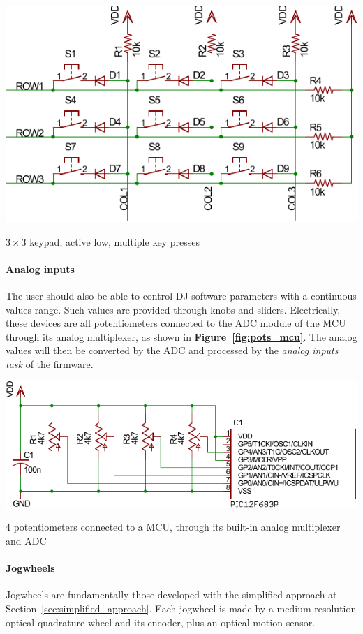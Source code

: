 \documentclass[a4paper,10pt]{article}
\makeatletter
\newenvironment{figurehere}{\def\@captype{figure}\vspace{2ex}}{\vspace{2ex}}
\newcommand{\citef}[1]{\textbf{Figure~\ref{#1}}}
\makeatother
\begin{document}
\begin{multicols}{2}
\begin{figurehere}
	\centering
	\includegraphics[keepaspectratio=true,width=0.8\columnwidth]{images/keypad.pdf}
	\caption{$ 3 \times 3 $ keypad, active low, multiple key presses}
	\label{fig:keypad}
\end{figurehere}


\paragraph{Analog inputs}
The user should also be able to control DJ software parameters with a 
continuous values range. Such values are provided through knobs and sliders.
Electrically, these devices are all potentiometers connected to the ADC module
of the MCU through its analog multiplexer, as shown in \citef{fig:pots_mcu}.
The analog values will then be converted by the ADC and processed by the
\emph{analog inputs task} of the firmware.

\begin{figurehere}
	\centering
	\includegraphics[keepaspectratio=true,width=\columnwidth]{images/pots_mcu.pdf}
	\caption{4 potentiometers connected to a MCU, through its built-in analog
	multiplexer and ADC}
	\label{fig:pots_mcu}
\end{figurehere}


\paragraph{Jogwheels}
Jogwheels are fundamentally those developed with the simplified approach at
Section~\ref{sec:simplified_approach}. Each jogwheel is made by a
medium-resolution optical quadrature wheel and its encoder, plus an optical
motion sensor.


\end{multicols}
\end{document}
